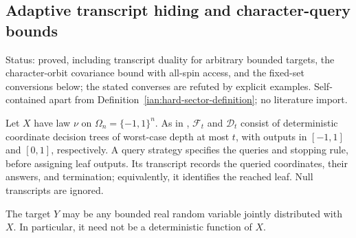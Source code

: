 \subsection{Adaptive transcript hiding and character-query bounds}\label{ian:adaptive-transcript-hiding}

Status: proved, including transcript duality for arbitrary bounded targets, the character-orbit covariance bound with all-spin access, and the fixed-set conversions below; the stated converses are refuted by explicit examples. Self-contained apart from Definition~\ref{ian:hard-sector-definition}; no literature import.

Let \(X\) have law \(\nu\) on \(\Omega_n=\{-1,1\}^n\). As in
,
\(\mathcal F_t\) and \(\mathcal D_t\) consist of deterministic coordinate decision trees of worst-case depth at most \(t\), with outputs in \([-1,1]\) and \([0,1]\), respectively. A query strategy specifies the queries and stopping rule, before assigning leaf outputs. Its transcript records the queried coordinates, their answers, and termination; equivalently, it identifies the reached leaf. Null transcripts are ignored.

The target \(Y\) may be any bounded real random variable jointly distributed with \(X\). In particular, it need not be a deterministic function of \(X\).

